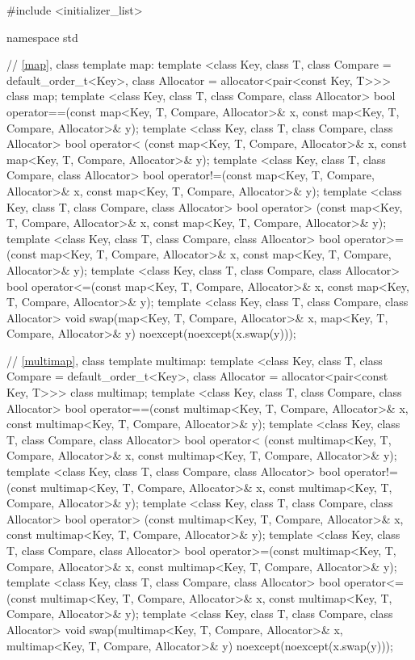 %
\begin{codeblock}
#include <initializer_list>

namespace std {
  // \ref{map}, class template map:
  template <class Key, class T, class Compare = default_order_t<Key>,
            class Allocator = allocator<pair<const Key, T>>>
    class map;
  template <class Key, class T, class Compare, class Allocator>
    bool operator==(const map<Key, T, Compare, Allocator>& x,
                    const map<Key, T, Compare, Allocator>& y);
  template <class Key, class T, class Compare, class Allocator>
    bool operator< (const map<Key, T, Compare, Allocator>& x,
                    const map<Key, T, Compare, Allocator>& y);
  template <class Key, class T, class Compare, class Allocator>
    bool operator!=(const map<Key, T, Compare, Allocator>& x,
                    const map<Key, T, Compare, Allocator>& y);
  template <class Key, class T, class Compare, class Allocator>
    bool operator> (const map<Key, T, Compare, Allocator>& x,
                    const map<Key, T, Compare, Allocator>& y);
  template <class Key, class T, class Compare, class Allocator>
    bool operator>=(const map<Key, T, Compare, Allocator>& x,
                    const map<Key, T, Compare, Allocator>& y);
  template <class Key, class T, class Compare, class Allocator>
    bool operator<=(const map<Key, T, Compare, Allocator>& x,
                    const map<Key, T, Compare, Allocator>& y);
  template <class Key, class T, class Compare, class Allocator>
    void swap(map<Key, T, Compare, Allocator>& x,
              map<Key, T, Compare, Allocator>& y)
      noexcept(noexcept(x.swap(y)));

  // \ref{multimap}, class template multimap:
  template <class Key, class T, class Compare = default_order_t<Key>,
            class Allocator = allocator<pair<const Key, T>>>
    class multimap;
  template <class Key, class T, class Compare, class Allocator>
    bool operator==(const multimap<Key, T, Compare, Allocator>& x,
                    const multimap<Key, T, Compare, Allocator>& y);
  template <class Key, class T, class Compare, class Allocator>
    bool operator< (const multimap<Key, T, Compare, Allocator>& x,
                    const multimap<Key, T, Compare, Allocator>& y);
  template <class Key, class T, class Compare, class Allocator>
    bool operator!=(const multimap<Key, T, Compare, Allocator>& x,
                    const multimap<Key, T, Compare, Allocator>& y);
  template <class Key, class T, class Compare, class Allocator>
    bool operator> (const multimap<Key, T, Compare, Allocator>& x,
                    const multimap<Key, T, Compare, Allocator>& y);
  template <class Key, class T, class Compare, class Allocator>
    bool operator>=(const multimap<Key, T, Compare, Allocator>& x,
                    const multimap<Key, T, Compare, Allocator>& y);
  template <class Key, class T, class Compare, class Allocator>
    bool operator<=(const multimap<Key, T, Compare, Allocator>& x,
                    const multimap<Key, T, Compare, Allocator>& y);
  template <class Key, class T, class Compare, class Allocator>
    void swap(multimap<Key, T, Compare, Allocator>& x,
              multimap<Key, T, Compare, Allocator>& y)
      noexcept(noexcept(x.swap(y)));

}
\end{codeblock}
